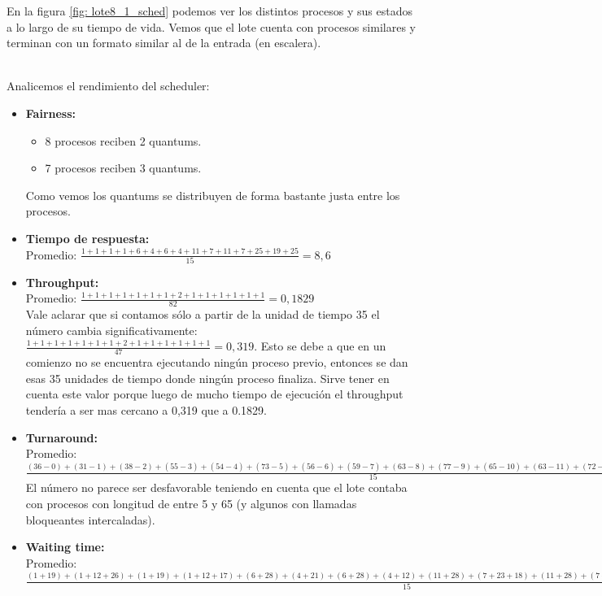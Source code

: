 \par En la figura \ref{fig: lote8_1_sched} podemos ver los distintos procesos y sus estados a lo largo de su tiempo de vida. Vemos que el lote cuenta con procesos similares y terminan con un formato similar al de la entrada (en escalera).\\\\
\par Analicemos el rendimiento del scheduler:
\begin{itemize}
	\item \textbf{Fairness:}
	\begin{itemize}
		\item 8 procesos reciben 2 quantums.
		\item 7 procesos reciben 3 quantums.
	\end{itemize}
	Como vemos los quantums se distribuyen de forma bastante justa entre los procesos.
	\item \textbf{Tiempo de respuesta:}\\
	Promedio: $\frac{1 + 1 + 1 + 1 + 6 + 4 + 6 + 4 + 11 + 7 + 11 + 7 + 25 + 19 + 25}{15} = 8,6$
	\item \textbf{Throughput:}\\
	Promedio: $\frac{1 + 1 + 1 + 1 + 1 + 1 + 1 + 2 + 1 + 1 + 1 + 1 + 1 + 1}{82} = 0,1829$ \\
	Vale aclarar que si contamos sólo a partir de la unidad de tiempo 35 el número cambia significativamente: $\frac{1 + 1 + 1 + 1 + 1 + 1 + 1 + 2 + 1 + 1 + 1 + 1 + 1 + 1}{47} = 0,319$. Esto se debe a que en un comienzo no se encuentra ejecutando ningún proceso previo, entonces se dan esas 35 unidades de tiempo donde ningún proceso finaliza. Sirve tener en cuenta este valor porque luego de mucho tiempo de ejecución el throughput tendería a ser mas cercano a 0,319 que a 0.1829.
	\item \textbf{Turnaround:}\\
	Promedio: $\frac{(36 - 0) + (31 - 1) + (38 - 2) + (55 - 3) + (54 - 4) + (73 - 5) + (56 - 6) + (59 - 7) + (63 - 8) + (77 - 9) + (65 - 10) + (63 - 11) + (72 - 12) + (81 - 13) + (74 - 14)}{15} = 52,8$ \\
	El número no parece ser desfavorable teniendo en cuenta que el lote contaba con procesos con longitud de entre 5 y 65 (y algunos con llamadas bloqueantes intercaladas).
	\item \textbf{Waiting time:}\\
	Promedio: $\frac{(1 + 19) + (1 + 12 + 26) + (1 + 19) + (1 + 12 + 17) + (6 + 28) + (4 + 21) + (6 + 28) + (4 + 12) + (11 + 28) + (7 + 23 + 18) + (11 + 28) + (7 + 16) + (25 + 19) + (19 + 20 + 9) + (25 + 19)}{15} = 33,53$
\end{itemize}
\FloatBarrier

